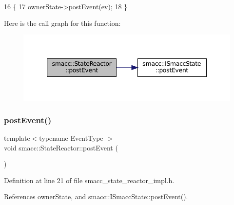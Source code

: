 \begin{DoxyCode}
16 \{
17     \hyperlink{classsmacc_1_1StateReactor_aabd30af9412a8fea9ec5906f173d9d4a}{ownerState}->\hyperlink{classsmacc_1_1ISmaccState_acef404ab3766ddf2892e8dad14a4a7cf}{postEvent}(ev);
18 \}
\end{DoxyCode}
Here is the call graph for this function\+:
\nopagebreak
\begin{figure}[H]
\begin{center}
\leavevmode
\includegraphics[width=347pt]{classsmacc_1_1StateReactor_a06303bdf908d04d5a6eb5f63131e68bd_cgraph}
\end{center}
\end{figure}
\mbox{\label{classsmacc_1_1StateReactor_a3d149851c5540110a29e9a7b3228239d}} 
\subsubsection{\texorpdfstring{post\+Event()}{postEvent()}\hspace{0.1cm}{\footnotesize\ttfamily [2/2]}}
{\footnotesize\ttfamily template$<$typename Event\+Type $>$ \\
void smacc\+::\+State\+Reactor\+::post\+Event (\begin{DoxyParamCaption}{ }\end{DoxyParamCaption})}



Definition at line 21 of file smacc\+\_\+state\+\_\+reactor\+\_\+impl.\+h.



References owner\+State, and smacc\+::\+I\+Smacc\+State\+::post\+Event().


